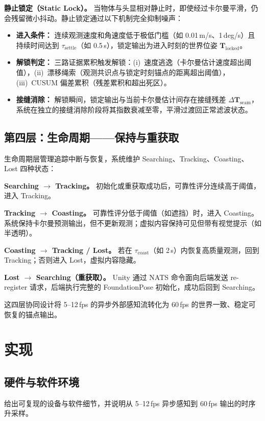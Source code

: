 \documentclass[review]{vgtc}
\begin{document}
\noindent\textbf{静止锁定（Static Lock）。} 当物体与头显相对静止时，即使经过卡尔曼平滑，仍会残留微小抖动。静止锁定通过以下机制完全抑制噪声：

\begin{itemize}[leftmargin=1.4em]
  \item \textbf{进入条件：} 连续观测速度和角速度低于极低门槛（如 0.01\,m/s、1\,deg/s）且持续时间达到 $\tau_{\text{settle}}$（如 0.5\,s），锁定输出为进入时刻的世界位姿 $\mathbf{T}_{\text{locked}}$。
  \item \textbf{解锁判定：} 三路证据累积触发解锁：(i)~速度逃逸（卡尔曼估计速度超出阈值），(ii)~漂移绳索（观测共识点与锁定时刻锚点的距离超出阈值），(iii)~CUSUM 偏差累积（残差累积和超出死区）。
  \item \textbf{接缝消除：} 解锁瞬间，锁定输出与当前卡尔曼估计间存在接缝残差 $\Delta\mathbf{T}_{\text{seam}}$，系统在独立的接缝消除阶段将其指数衰减至零，平滑过渡回正常滤波状态。
\end{itemize}

\subsection{第四层：生命周期——保持与重获取}

生命周期层管理追踪中断与恢复，系统维护 Searching、Tracking、Coasting、Lost 四种状态：

\noindent\textbf{Searching $\rightarrow$ Tracking。} 初始化或重获取成功后，可靠性评分连续高于阈值，进入 Tracking。

\noindent\textbf{Tracking $\rightarrow$ Coasting。} 可靠性评分低于阈值（如遮挡）时，进入 Coasting。系统保持卡尔曼预测输出，但不更新观测；虚拟内容保持可见但带有视觉提示（如半透明）。

\noindent\textbf{Coasting $\rightarrow$ Tracking / Lost。} 若在 $\tau_{\text{coast}}$（如 2\,s）内恢复高质量观测，回到 Tracking；否则进入 Lost，虚拟内容隐藏。

\noindent\textbf{Lost $\rightarrow$ Searching（重获取）。} Unity 通过 NATS 命令面向后端发送 re-register 请求，后端执行完整的 FoundationPose 初始化，成功后回到 Searching。

这四层协同设计将 5--12\,fps 的异步外部感知流转化为 60\,fps 的世界一致、稳定可恢复的锚点输出。

\section{实现}

\subsection{硬件与软件环境}
给出可复现的设备与软件细节，并说明从 5--12\,fps 异步感知到 60\,fps 输出的时序升采样。
\end{document}
